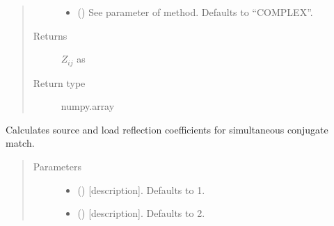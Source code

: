 \documentclass[letterpaper,10pt,english]{sphinxmanual}
\begin{document}
\begin{fulllineitems}
\begin{fulllineitems}
\begin{quote}
\begin{description}
\begin{itemize}
\item {} 
 (\sphinxstyleliteralemphasis{\sphinxupquote{, }}) \textendash{} See  parameter of  method. Defaults to “COMPLEX”.

\end{itemize}

\item[{Returns}] \leavevmode
\(Z_{i j}\) as 

\item[{Return type}] \leavevmode
numpy.array

\end{description}\end{quote}

\end{fulllineitems}


\begin{fulllineitems}
\label{\detokenize{touchstone:touchstone.spfile.Z_conjmatch}}
Calculates source and load reflection coefficients for simultaneous conjugate match.
\begin{quote}\begin{description}
\item[{Parameters}] \leavevmode\begin{itemize}
\item {} 
 (\sphinxstyleliteralemphasis{\sphinxupquote{, }}) \textendash{} {[}description{]}. Defaults to 1.

\item {} 
 (\sphinxstyleliteralemphasis{\sphinxupquote{, }}) \textendash{} {[}description{]}. Defaults to 2.

\end{itemize}


\end{description}
\end{quote}
\end{fulllineitems}
\end{fulllineitems}
\end{document}
